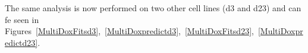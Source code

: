 \documentclass{article}
\begin{document}
The same analysis is now performed on two other cell lines (d3 and d23) and can fe seen in Figures~\ref{MultiDoxFitsd3},~\ref{MultiDoxpredictd3},~\ref{MultiDoxFitsd23},~\ref{MultiDoxpredictd23}.
\begin{figure}[h!]
\centering
{}

\end{figure}
\end{document}
